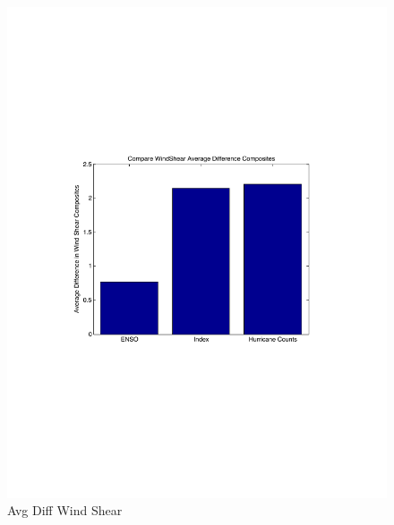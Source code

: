 \documentclass[a4paper,10pt]{article}
\begin{document}
\begin{figure}[ht]
\begin{minipage}[b]{0.6\linewidth}
\includegraphics[width=\textwidth]{figs/sensitivityResults/compositeBarGraphs/avgDiffWindShearBarGraph.pdf}
\caption{Avg Diff Wind Shear}
\label{fig:figure28}
\end{minipage}
\end{figure}
\end{document}
